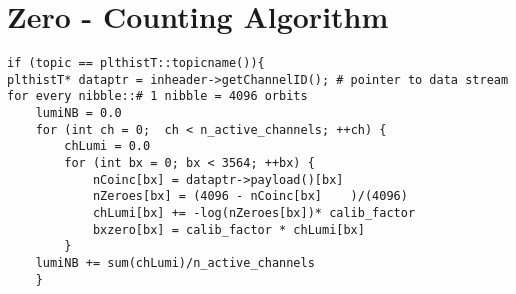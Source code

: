 \section{Zero - Counting Algorithm}

\begin{verbatim}
if (topic == plthistT::topicname()){
plthistT* dataptr = inheader->getChannelID(); # pointer to data stream
for every nibble::# 1 nibble = 4096 orbits
    lumiNB = 0.0
    for (int ch = 0;  ch < n_active_channels; ++ch) {
        chLumi = 0.0
        for (int bx = 0; bx < 3564; ++bx) {
            nCoinc[bx] = dataptr->payload()[bx]
            nZeroes[bx] = (4096 - nCoinc[bx]	)/(4096)
            chLumi[bx] += -log(nZeroes[bx])* calib_factor
            bxzero[bx] = calib_factor * chLumi[bx]
        }
    lumiNB += sum(chLumi)/n_active_channels
    }
\end{verbatim}



